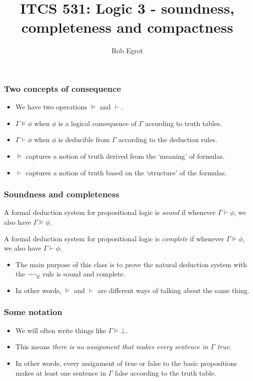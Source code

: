 \documentclass[handout]{beamer}
\title{ITCS 531: Logic 3 - soundness, completeness and compactness}
\date{}
\author{Rob Egrot}
\begin{document}
\begin{frame}
\titlepage
\end{frame}

\begin{frame}
\frametitle{Two concepts of consequence}
\begin{itemize}
\item We have two operations $\models$ and $\vdash$.
\vspace{.3cm}
\item $\Gamma\models \phi$ when $\phi$ is a logical consequence of $\Gamma$ according to truth tables.
\vspace{.3cm}
\item $\Gamma\vdash \phi$ when $\phi$ is deducible from $\Gamma$ according to the deduction rules.
\vspace{.3cm}
\item $\models$ captures a notion of truth derived from the `meaning' of formulas.
\vspace{.3cm}
\item $\vdash$ captures a notion of truth based on the `structure' of the formulas. 
\end{itemize}
\end{frame}

\begin{frame}
\frametitle{Soundness and completeness}

\begin{definition}[Sound]
A formal deduction system for propositional logic is \emph{sound} if whenever $\Gamma\vdash \phi$, we also have $\Gamma\models \phi$. 
\end{definition}   
\vspace{.5cm}
\begin{definition}[Complete]
A formal deduction system for propositional logic is \emph{complete} if whenever $\Gamma\models \phi$, we also have $\Gamma\vdash \phi$.  
\end{definition}
\vspace{.5cm}
\begin{itemize}
\item The main purpose of this class is to prove the natural deduction system with the $\neg\neg_E$ rule is sound and complete.
\item In other words, $\models$ and $\vdash$ are different ways of talking about the same thing.
\end{itemize}
\end{frame}

\begin{frame}
\frametitle{Some notation}
\begin{itemize}
\item We will often write things like $\Gamma\models \bot$.
\vspace{1cm}
\item This means \emph{there is no assignment that makes every sentence in $\Gamma$ true}.
\vspace{1cm}
\item In other words, every assignment of true or false to the basic propositions makes at least one sentence in $\Gamma$ false according to the truth table.
\end{itemize}
\end{frame}
\end{document}
